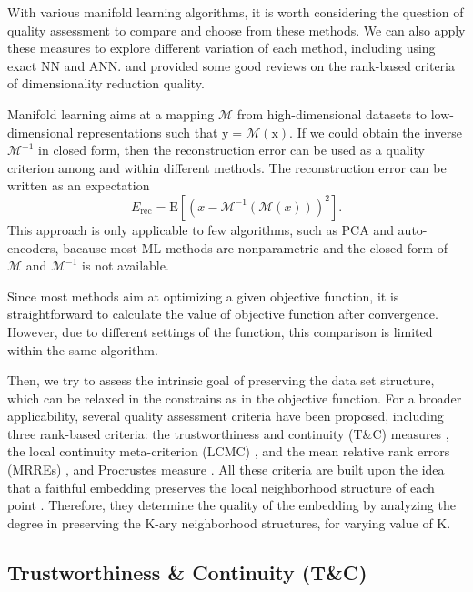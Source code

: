 \documentclass[11pt,a4paper,]{article}
\begin{document}
With various manifold learning algorithms, it is worth considering the question of quality assessment to compare and choose from these methods. We can also apply these measures to explore different variation of each method, including using exact NN and ANN. \textcite{Lee2008-cx} and \textcite{Gracia2014-ae} provided some good reviews on the rank-based criteria of dimensionality reduction quality.

Manifold learning aims at a mapping \(\mathcal{M}\) from high-dimensional datasets to low-dimensional representations such that \(\mathrm{y} = \mathcal{M}(\mathrm{x})\). If we could obtain the inverse \(\mathcal{M}^{-1}\) in closed form, then the reconstruction error can be used as a quality criterion among and within different methods. The reconstruction error can be written as an expectation
\[
E_{\mathrm{rec}}=\mathrm{E}\left[ \left(x-\mathcal{M}^{-1}(\mathcal{M}(x))\right)^{2} \right].
\]
This approach is only applicable to few algorithms, such as PCA and auto-encoders, bacause most ML methods are nonparametric and the closed form of \(\mathcal{M}\) and \(\mathcal{M}^{-1}\) is not available.

Since most methods aim at optimizing a given objective function, it is straightforward to calculate the value of objective function after convergence. However, due to different settings of the function, this comparison is limited within the same algorithm.

Then, we try to assess the intrinsic goal of preserving the data set structure, which can be relaxed in the constrains as in the objective function. For a broader applicability, several quality assessment criteria have been proposed, including three rank-based criteria: the trustworthiness and continuity (T\&C) measures \autocite{Venna2006-nd}, the local continuity meta-criterion (LCMC) \autocite{Chen2009-su}, and the mean relative rank errors (MRREs) \autocite{Lee2007-wq}, and Procrustes measure \autocite{Goldberg2009-tb}. All these criteria are built upon the idea that a faithful embedding preserves the local neighborhood structure of each point \autocite*{Goldberg2009-tb}.
Therefore, they determine the quality of the embedding by analyzing the degree in preserving the K-ary neighborhood structures, for varying value of K.

\hypertarget{trustworthiness-continuity-tc}{%
\subsection{Trustworthiness \& Continuity (T\&C)}\label{trustworthiness-continuity-tc}}
\end{document}
